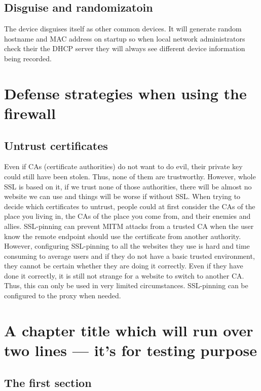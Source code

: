 \documentclass[mscthesis]{usiinfthesis}
\begin{document}
\section{Disguise and randomizatoin}

The device disguises itself as other common devices. It will generate random hostname and MAC address on startup so when local network administrators check their the DHCP server they will always see different device information being recorded.

\chapter{Defense strategies when using the firewall}

\section{Untrust certificates}

Even if CAs (certificate authorities) do not want to do evil, their private key could still have been stolen. Thus, none of them are trustworthy. However, whole SSL is based on it, if we trust none of those authorities, there will be almost no website we can use and things will be worse if without SSL. When trying to decide which certificates to untrust, people could at first consider the CAs of the place you living in, the CAs of the place you come from, and their enemies and allies. SSL-pinning can prevent MITM attacks from a trusted CA when the user know the remote endpoint should use the certificate from another authority. However, configuring SSL-pinning to all the websites they use is hard and time consuming to average users and if they do not have a basic trusted environment, they cannot be certain whether they are doing it correctly. Even if they have done it correctly, it is still not strange for a website to switch to another CA. Thus, this can only be used in very limited circumstances. SSL-pinning can be configured to the proxy when needed.

\chapter[Short title]{A chapter title which will run over two lines --- it's for
  testing purpose}

\section{The first section}
\end{document}
